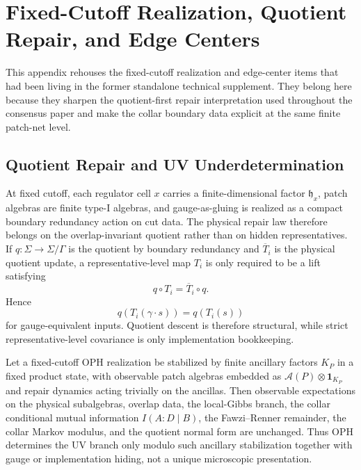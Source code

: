 \section{Fixed-Cutoff Realization, Quotient Repair, and Edge Centers}
\label{app:consensus-fixed-cutoff-port}

This appendix rehouses the fixed-cutoff realization and edge-center items that had been living in
the former standalone technical supplement. They belong here because they sharpen the
quotient-first repair interpretation used throughout the consensus paper and make the collar
boundary data explicit at the same finite patch-net level.

\subsection{Quotient Repair and UV Underdetermination}

At fixed cutoff, each regulator cell \(x\) carries a finite-dimensional factor
\(\mathfrak h_x\), patch algebras are finite type-I algebras, and gauge-as-gluing is realized as
a compact boundary redundancy action on cut data. The physical repair law therefore belongs on the
overlap-invariant quotient rather than on hidden representatives. If \(q:\Sigma\to\Sigma/\Gamma\)
is the quotient by boundary redundancy and \(\overline T_i\) is the physical quotient update, a
representative-level map \(T_i\) is only required to be a lift satisfying
\[
q\circ T_i=\overline T_i\circ q.
\]
Hence
\[
q(T_i(\gamma\cdot s))=q(T_i(s))
\]
for gauge-equivalent inputs. Quotient descent is therefore structural, while strict
representative-level covariance is only implementation bookkeeping.

\begin{proposition}
Let a fixed-cutoff OPH realization be stabilized by finite ancillary factors \(K_P\) in a fixed
product state, with observable patch algebras embedded as
\(\mathcal A(P)\otimes \mathbf 1_{K_P}\) and repair dynamics acting trivially on the ancillas.
Then observable expectations on the physical subalgebras, overlap data, the local-Gibbs branch,
the collar conditional mutual information \(I(A:D\mid B)\), the Fawzi--Renner remainder, the
collar Markov modulus, and the quotient normal form are unchanged. Thus OPH determines the UV
branch only modulo such ancillary stabilization together with gauge or implementation hiding, not
a unique microscopic presentation.
\end{proposition}

